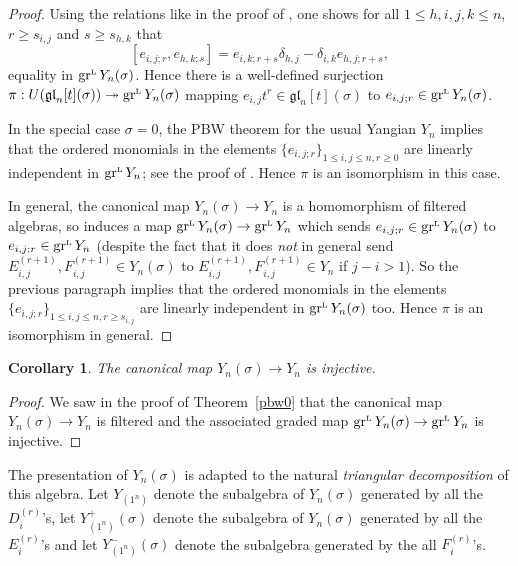 \documentclass[twoside,12pt,reqno]{amsart}
\newtheorem{Corollary}[Proposition]{Corollary}
\def\LL{{{\scriptscriptstyle\text{\rm{L}}}}}
\def\gr{\operatorname{gr}}
\begin{document}
\begin{proof}
Using the relations like in the proof of \cite[Lemma 5.8]{BK}, one shows
for all $1 \leq h,i,j,k \leq n$, $r \geq s_{i,j}$ and
$s \geq s_{h,k}$ that
\begin{equation}\label{assgr}
[e_{i,j;r}, e_{h,k;s}]
= e_{i,k;r+s} \delta_{h,j}
- \delta_{i,k} e_{h,j;r+s},
\end{equation}
equality in $\gr^\LL Y_n(\sigma)$.
Hence there is a well-defined
surjection
$\pi:U(\mathfrak{gl}_n[t](\sigma)) \twoheadrightarrow
\gr^\LL Y_n(\sigma)$
mapping $e_{i,j}t^r \in \mathfrak{gl}_n[t](\sigma)$ to 
$e_{i,j;r} \in \gr^\LL Y_n(\sigma)$.

In the special case $\sigma = 0$,
the PBW theorem for the usual Yangian $Y_n$ 
implies that the ordered monomials in the elements
$\{e_{i,j;r}\}_{1 \leq i,j \leq n, r \geq 0}$ are linearly
independent in $\gr^\LL Y_n$; see the proof of
\cite[Lemma 5.10]{BK}. Hence $\pi$ is an isomorphism
in this case.

In general, the canonical map $Y_n(\sigma) \rightarrow Y_n$ 
is a homomorphism of filtered algebras, so
induces a map $\gr^\LL Y_n(\sigma) \rightarrow \gr^\LL Y_n$
which sends $e_{i,j;r} \in \gr^\LL Y_n(\sigma)$ to
$e_{i,j;r} \in \gr^\LL Y_n$ (despite the fact that
it does {\em not} in general 
send $E_{i,j}^{(r+1)}, F_{i,j}^{(r+1)} \in Y_n(\sigma)$ 
to $E_{i,j}^{(r+1)},F_{i,j}^{(r+1)} \in Y_n$ if $j-i>1$). 
So the previous paragraph
implies that the 
ordered monomials in the elements
$\{e_{i,j;r}\}_{1 \leq i,j \leq n, r \geq s_{i,j}}$ are linearly
independent in $\gr^\LL Y_n(\sigma)$ too.
Hence $\pi$ is an isomorphism in general.
\end{proof}

\begin{Corollary}\label{injcor}
The canonical map $Y_n(\sigma) \rightarrow Y_n$ is injective.
\end{Corollary}

\begin{proof}
We saw in the proof of Theorem~\ref{pbw0} that the 
canonical map $Y_n(\sigma) \rightarrow Y_n$ is filtered 
and the associated graded
map $\gr^\LL Y_n(\sigma) \rightarrow \gr^\LL Y_n$
is injective. 
\end{proof}

The presentation of $Y_n(\sigma)$
is adapted to the natural {\em triangular decomposition}
of this algebra. Let $Y_{(1^n)}$ denote the subalgebra
of $Y_n(\sigma)$ generated by all the 
$D_i^{(r)}$'s,
let $Y_{(1^n)}^+(\sigma)$ denote the subalgebra of $Y_n(\sigma)$
generated by all the $E_{i}^{(r)}$'s
and let $Y_{(1^n)}^-(\sigma)$ denote the subalgebra generated by the
all $F_{i}^{(r)}$'s.
\end{document}
